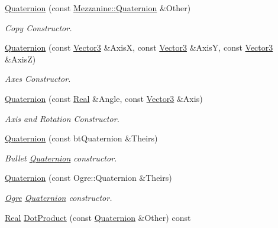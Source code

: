 \begin{DoxyCompactItemize}
\hyperlink{classMezzanine_1_1Quaternion_a59a9405642d5e20949273c0e03f7db3e}{Quaternion} (const \hyperlink{classMezzanine_1_1Quaternion}{Mezzanine::Quaternion} \&Other)
\begin{DoxyCompactList}\small\item\em Copy Constructor. \item\end{DoxyCompactList}\item 
\hyperlink{classMezzanine_1_1Quaternion_a8e619d27d060d4ca36b8300cf9f33126}{Quaternion} (const \hyperlink{classMezzanine_1_1Vector3}{Vector3} \&AxisX, const \hyperlink{classMezzanine_1_1Vector3}{Vector3} \&AxisY, const \hyperlink{classMezzanine_1_1Vector3}{Vector3} \&AxisZ)
\begin{DoxyCompactList}\small\item\em Axes Constructor. \item\end{DoxyCompactList}\item 
\hyperlink{classMezzanine_1_1Quaternion_a86a46d0ce78a6ce83cc40ed2d03349d4}{Quaternion} (const \hyperlink{namespaceMezzanine_a726731b1a7df72bf3583e4a97282c6f6}{Real} \&Angle, const \hyperlink{classMezzanine_1_1Vector3}{Vector3} \&Axis)
\begin{DoxyCompactList}\small\item\em Axis and Rotation Constructor. \item\end{DoxyCompactList}\item 
\hyperlink{classMezzanine_1_1Quaternion_af1636e407afa812df5b2908ca1e13181}{Quaternion} (const btQuaternion \&Theirs)
\begin{DoxyCompactList}\small\item\em Bullet \hyperlink{classMezzanine_1_1Quaternion}{Quaternion} constructor. \item\end{DoxyCompactList}\item 
\hyperlink{classMezzanine_1_1Quaternion_a141151c34bc40191200cb641a6f97943}{Quaternion} (const Ogre::Quaternion \&Theirs)
\begin{DoxyCompactList}\small\item\em \hyperlink{namespaceOgre}{Ogre} \hyperlink{classMezzanine_1_1Quaternion}{Quaternion} constructor. \item\end{DoxyCompactList}\item 
\hyperlink{namespaceMezzanine_a726731b1a7df72bf3583e4a97282c6f6}{Real} \hyperlink{classMezzanine_1_1Quaternion_af06c0fa923c0bb9ede40c2973f202684}{DotProduct} (const \hyperlink{classMezzanine_1_1Quaternion}{Quaternion} \&Other) const 

\end{DoxyCompactItemize}
